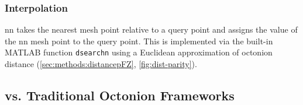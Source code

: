 \documentclass[preprint,12pt]{elsarticle}
\begin{document}
\subsubsection{ Interpolation}
\label{sec:methods:nn}


\Gls{nn} takes the nearest mesh point relative to a query point and assigns the value of the \gls{nn} mesh point to the query point. This is implemented via the built-in MATLAB function \texttt{dsearchn} using a Euclidean approximation of octonion distance (\cref{sec:methods:distancepFZ}, \cref{fig:dist-parity}).

\subsection{ vs. Traditional Octonion Frameworks} \label{sec:methods:closed-mesh-comparison}

\end{document}
